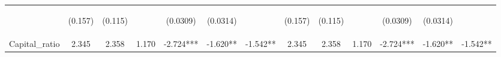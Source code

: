 \documentclass[]{article}
\begin{document}
\begin{center}
\begin{tabular}{lcccccccccccc}
\vspace{4pt} & \begin{footnotesize}(0.157)\end{footnotesize} & \begin{footnotesize}(0.115)\end{footnotesize} & \begin{footnotesize}\end{footnotesize} & \begin{footnotesize}(0.0309)\end{footnotesize} & \begin{footnotesize}(0.0314)\end{footnotesize} & \begin{footnotesize}\end{footnotesize} & \begin{footnotesize}(0.157)\end{footnotesize} & \begin{footnotesize}(0.115)\end{footnotesize} & \begin{footnotesize}\end{footnotesize} & \begin{footnotesize}(0.0309)\end{footnotesize} & \begin{footnotesize}(0.0314)\end{footnotesize} & \begin{footnotesize}\end{footnotesize} \\
Capital\_ratio & 2.345 & 2.358 & 1.170 & -2.724*** & -1.620** & -1.542** & 2.345 & 2.358 & 1.170 & -2.724*** & -1.620** & -1.542** \\

\end{tabular}
\end{center}
\end{document}
